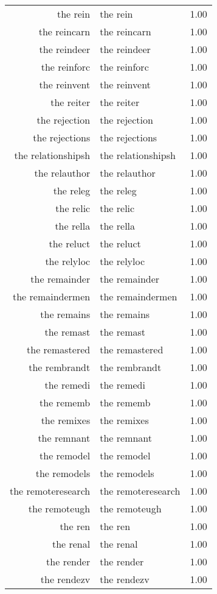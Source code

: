 \begin{table}[ht]
\begin{tabular}{rlr}
  the rein & the rein & 1.00 \\ 
  the reincarn & the reincarn & 1.00 \\ 
  the reindeer & the reindeer & 1.00 \\ 
  the reinforc & the reinforc & 1.00 \\ 
  the reinvent & the reinvent & 1.00 \\ 
  the reiter & the reiter & 1.00 \\ 
  the rejection & the rejection & 1.00 \\ 
  the rejections & the rejections & 1.00 \\ 
  the relationshipsh & the relationshipsh & 1.00 \\ 
  the relauthor & the relauthor & 1.00 \\ 
  the releg & the releg & 1.00 \\ 
  the relic & the relic & 1.00 \\ 
  the rella & the rella & 1.00 \\ 
  the reluct & the reluct & 1.00 \\ 
  the relyloc & the relyloc & 1.00 \\ 
  the remainder & the remainder & 1.00 \\ 
  the remaindermen & the remaindermen & 1.00 \\ 
  the remains & the remains & 1.00 \\ 
  the remast & the remast & 1.00 \\ 
  the remastered & the remastered & 1.00 \\ 
  the rembrandt & the rembrandt & 1.00 \\ 
  the remedi & the remedi & 1.00 \\ 
  the rememb & the rememb & 1.00 \\ 
  the remixes & the remixes & 1.00 \\ 
  the remnant & the remnant & 1.00 \\ 
  the remodel & the remodel & 1.00 \\ 
  the remodels & the remodels & 1.00 \\ 
  the remoteresearch & the remoteresearch & 1.00 \\ 
  the remoteugh & the remoteugh & 1.00 \\ 
  the ren & the ren & 1.00 \\ 
  the renal & the renal & 1.00 \\ 
  the render & the render & 1.00 \\ 
  the rendezv & the rendezv & 1.00 \\ 

\end{tabular}
\end{table}
